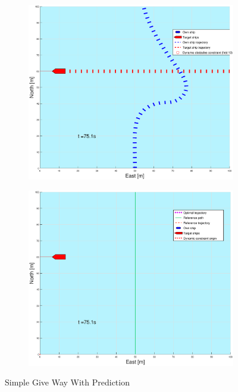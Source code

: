 \begin{figure}[ht]
\begin{subfigure}[b]{0.499\textwidth}
    \end{subfigure}
    \hfill
    \\
    \begin{subfigure}[b]{0.49\textwidth}
        \centering
        \includegraphics[width=\textwidth]{Images/Figures/enkel_GW/_Simple_0fig1_time=75}
    \end{subfigure}
    \hfill
    \begin{subfigure}[b]{0.499\textwidth}
        \centering
        \includegraphics[width=\textwidth]{Images/Figures/enkel_GW/_Simple_0fig999_time=75}
    \end{subfigure}
    \hfill
    \caption{Simple Give Way With Prediction}
\end{figure}

